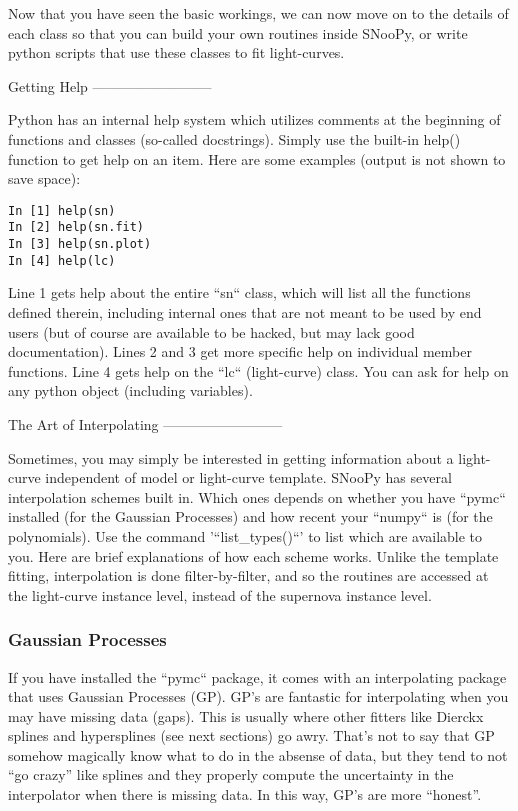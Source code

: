 Now that you have seen the basic workings, we can now move on to the
details of each class so that you can build your own routines inside
SNooPy, or write python scripts that use these classes to fit light-curves. 


Getting Help
--------------------------

Python has an internal help system which utilizes comments at the
beginning of functions and classes (so-called docstrings). Simply
use the built-in help() function to get help on an item. Here are
some examples (output is not shown to save space):

\begin{verbatim}
In [1] help(sn)
In [2] help(sn.fit)
In [3] help(sn.plot)
In [4] help(lc)
\end{verbatim}

Line 1 gets help about the entire ``sn`` class, which will list
all the functions defined therein, including internal ones that are
not meant to be used by end users (but of course are available to
be hacked, but may lack good documentation). Lines 2 and 3 get more
specific help on individual member functions. Line 4 gets help on
the ``lc`` (light-curve) class. You can ask for help on any python
object (including variables).


The Art of Interpolating \label{sub:Splining}
--------------------------

Sometimes, you may simply be interested in getting information about
a light-curve independent of model or light-curve template. SNooPy
has several interpolation schemes built in. Which ones depends on
whether you have ``pymc`` installed (for the Gaussian Processes)
and how recent your ``numpy`` is (for the polynomials). Use the
command '``list_types()``' to list which are available to you.
Here are brief explanations of how each scheme works. Unlike the template
fitting, interpolation is done filter-by-filter, and so the routines
are accessed at the light-curve instance level, instead of the supernova
instance level.


\subsubsection{Gaussian Processes}

If you have installed the ``pymc`` package, it comes with an
interpolating package that uses Gaussian Processes (GP). GP's are
fantastic for interpolating when you may have missing data (gaps).
This is usually where other fitters like Dierckx splines and hypersplines
(see next sections) go awry. That's not to say that GP somehow magically
know what to do in the absense of data, but they tend to not ``go
crazy'' like splines and they properly compute the uncertainty in
the interpolator when there is missing data. In this way, GP's are
more ``honest''.

